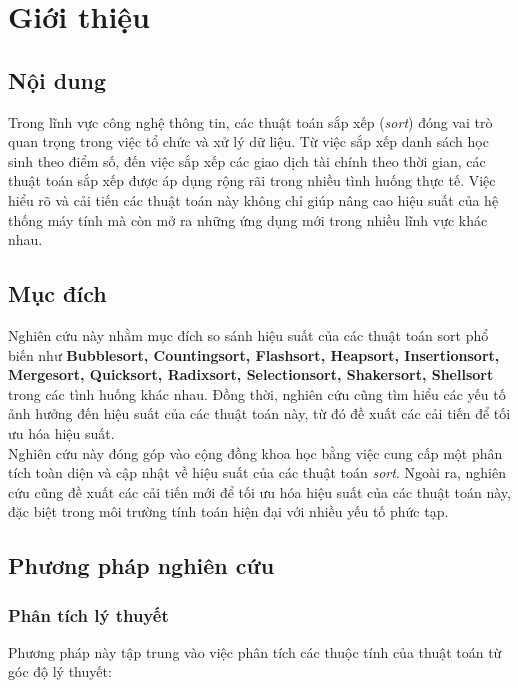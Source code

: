 \section{Giới thiệu}

\subsection{Nội dung}
Trong lĩnh vực công nghệ thông tin, các thuật toán sắp xếp (\textit{sort}) đóng vai trò quan trọng trong việc tổ chức và xử lý dữ liệu. Từ việc sắp xếp danh sách học sinh theo điểm số, đến việc sắp xếp các giao dịch tài chính theo thời gian, các thuật toán sắp xếp được áp dụng rộng rãi trong nhiều tình huống thực tế. Việc hiểu rõ và cải tiến các thuật toán này không chỉ giúp nâng cao hiệu suất của hệ thống máy tính mà còn mở ra những ứng dụng mới trong nhiều lĩnh vực khác nhau.
\subsection{Mục đích}
Nghiên cứu này nhằm mục đích so sánh hiệu suất của các thuật toán sort phổ biến như \textbf{Bubblesort, Countingsort, Flashsort, Heapsort, Insertionsort, Mergesort, Quicksort, Radixsort, Selectionsort, Shakersort, Shellsort} trong các tình huống khác nhau. Đồng thời, nghiên cứu cũng tìm hiểu các yếu tố ảnh hưởng đến hiệu suất của các thuật toán này, từ đó đề xuất các cải tiến để tối ưu hóa hiệu suất.\\
Nghiên cứu này đóng góp vào cộng đồng khoa học bằng việc cung cấp một phân tích toàn diện và cập nhật về hiệu suất của các thuật toán \textit{sort}. Ngoài ra, nghiên cứu cũng đề xuất các cải tiến mới để tối ưu hóa hiệu suất của các thuật toán này, đặc biệt trong môi trường tính toán hiện đại với nhiều yếu tố phức tạp.

\subsection{Phương pháp nghiên cứu}

\subsubsection{Phân tích lý thuyết}
Phương pháp này tập trung vào việc phân tích các thuộc tính của thuật toán từ góc độ lý thuyết:

